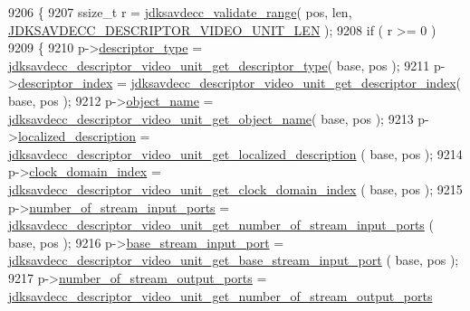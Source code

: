 \begin{DoxyCode}
9206 \{
9207     ssize\_t r = \hyperlink{group__util_ga9c02bdfe76c69163647c3196db7a73a1}{jdksavdecc\_validate\_range}( pos, len, 
      \hyperlink{group__descriptor__video_ga7748447728321b40379327f279dca7de}{JDKSAVDECC\_DESCRIPTOR\_VIDEO\_UNIT\_LEN} );
9208     \textcolor{keywordflow}{if} ( r >= 0 )
9209     \{
9210         p->\hyperlink{structjdksavdecc__descriptor__video__unit_ab7c32b6c7131c13d4ea3b7ee2f09b78d}{descriptor\_type} = 
      \hyperlink{group__descriptor__video_gada9bd76b0909493f2526da1e0a36eb82}{jdksavdecc\_descriptor\_video\_unit\_get\_descriptor\_type}( 
      base, pos );
9211         p->\hyperlink{structjdksavdecc__descriptor__video__unit_a042bbc76d835b82d27c1932431ee38d4}{descriptor\_index} = 
      \hyperlink{group__descriptor__video_ga690c3282d5e4c92556e8dbe7a9d5c6f7}{jdksavdecc\_descriptor\_video\_unit\_get\_descriptor\_index}(
       base, pos );
9212         p->\hyperlink{structjdksavdecc__descriptor__video__unit_a7d1f5945a13863b1762fc6db74fa8f80}{object\_name} = 
      \hyperlink{group__descriptor__video_ga53281a94748c059175ceb96da6b3022e}{jdksavdecc\_descriptor\_video\_unit\_get\_object\_name}( base, pos
       );
9213         p->\hyperlink{structjdksavdecc__descriptor__video__unit_a0926f846ca65a83ad5bb06b4aff8f408}{localized\_description} = 
      \hyperlink{group__descriptor__video_ga1e0ce4888ad273b5c73d4aee66ac5eba}{jdksavdecc\_descriptor\_video\_unit\_get\_localized\_description}
      ( base, pos );
9214         p->\hyperlink{structjdksavdecc__descriptor__video__unit_a6608f023d147b556a49527d568abed8e}{clock\_domain\_index} = 
      \hyperlink{group__descriptor__video_ga964ea86012ff42f3aa4704ad9b900a86}{jdksavdecc\_descriptor\_video\_unit\_get\_clock\_domain\_index}
      ( base, pos );
9215         p->\hyperlink{structjdksavdecc__descriptor__video__unit_ad00c23883f3271704e11719abc6f7ad7}{number\_of\_stream\_input\_ports} = 
      \hyperlink{group__descriptor__video_ga415229a025c64b9593065d64d85782fe}{jdksavdecc\_descriptor\_video\_unit\_get\_number\_of\_stream\_input\_ports}
      ( base, pos );
9216         p->\hyperlink{structjdksavdecc__descriptor__video__unit_a8ad4ba35aee3ad22d5e946438bbaba53}{base\_stream\_input\_port} = 
      \hyperlink{group__descriptor__video_ga27ac1cac7af1115dea1a731987f981f6}{jdksavdecc\_descriptor\_video\_unit\_get\_base\_stream\_input\_port}
      ( base, pos );
9217         p->\hyperlink{structjdksavdecc__descriptor__video__unit_a6b331604e3f2b2db126dbf0a7c81b0fa}{number\_of\_stream\_output\_ports} = 
      \hyperlink{group__descriptor__video_ga1952d9279403d16b51b3890d37279620}{jdksavdecc\_descriptor\_video\_unit\_get\_number\_of\_stream\_output\_ports}

\end{DoxyCode}
